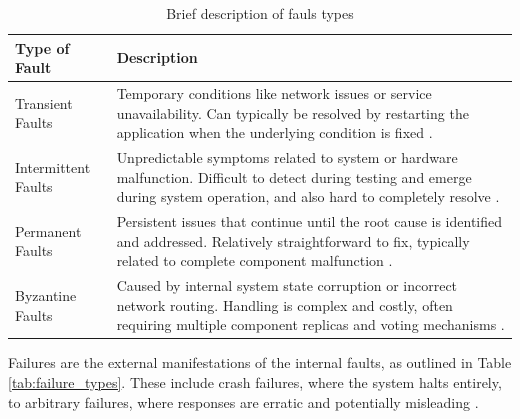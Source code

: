 \begin{table}[h!]
    \centering
    \begin{tabular}{|l|p{11.3cm}|}
        \hline
        \textbf{Type of Fault} & \textbf{Description}                                                                                                                                                                                \\ \hline
        Transient Faults       & Temporary conditions like network issues or service unavailability. Can typically be resolved by restarting the application when the underlying condition is fixed \cite{Isukapalli2024}.           \\ \hline
        Intermittent Faults    & Unpredictable symptoms related to system or hardware malfunction. Difficult to detect during testing and emerge during system operation, and also hard to completely resolve \cite{Isukapalli2024}. \\ \hline
        Permanent Faults       & Persistent issues that continue until the root cause is identified and addressed. Relatively straightforward to fix, typically related to complete component malfunction \cite{Tanenbaum2023}.      \\ \hline
        Byzantine Faults       & Caused by internal system state corruption or incorrect network routing. Handling is complex and costly, often requiring multiple component replicas and voting mechanisms \cite{Isukapalli2024}.   \\ \hline
    \end{tabular}
    \caption{Brief description of fauls types}
    \label{tab:faults_types}
\end{table}

Failures are the external manifestations of the internal faults, as outlined in Table \ref{tab:failure_types}. These include crash failures, where the system halts entirely, to arbitrary failures, where responses are erratic and potentially misleading \cite{Tanenbaum2023}.


